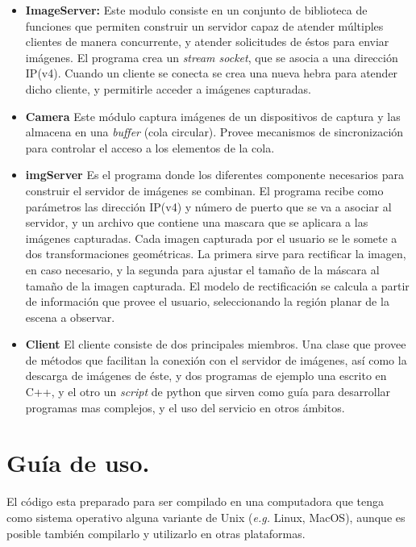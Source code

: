 \documentclass[12pt,letterpaper,notitlepage]{report}
\newlength{\spacing} \setlength{\spacing}{\baselineskip}
\newcommand{\nspace}[1]{\setlength{\baselineskip}{#1\spacing}}
\newenvironment{linespacing}[1]{\nspace{#1}}{}
\begin{document}
{\begin{linespacing}{1.5}
\begin{itemize}

\item {\bfseries ImageServer:} Este modulo consiste en un conjunto de biblioteca de funciones que permiten construir un servidor capaz de atender múltiples clientes de manera concurrente, y atender solicitudes de éstos para enviar imágenes. El programa crea un \emph {stream socket}, que se asocia a una dirección IP(v4). Cuando un cliente se conecta se crea una nueva hebra para atender dicho cliente, y permitirle acceder a imágenes capturadas.

\item {\bfseries Camera} Este módulo captura imágenes de un dispositivos de captura y las almacena en una \emph {buffer} (cola circular). Provee mecanismos de sincronización para controlar el acceso a los elementos de la cola.

\item {\bfseries imgServer} Es el programa donde los diferentes componente necesarios para construir el servidor de imágenes se combinan. El programa recibe como parámetros las dirección IP(v4) y número de puerto que se va a asociar al servidor, y un archivo que contiene una mascara que se aplicara a las imágenes capturadas. Cada imagen capturada por el usuario se le somete a dos transformaciones geométricas. La primera sirve para rectificar la imagen, en caso necesario, y la segunda para ajustar el tamaño de la máscara al tamaño de la imagen capturada. El modelo de rectificación se calcula a partir de información que provee el usuario, seleccionando la región planar de la escena a observar. 

\item {\bfseries Client} El cliente consiste de dos principales miembros. Una clase que provee de métodos que facilitan la conexión con el servidor de imágenes, así como la descarga de imágenes de éste, y dos programas de ejemplo una escrito en C++, y el otro un \emph {script} de python que sirven como guía para desarrollar programas mas complejos, y el uso del servicio en otros ámbitos. 

\end{itemize}

\section{Guía de uso.}
 
El  código esta  preparado para  ser compilado  en una  computadora que
tenga como  sistema operativo alguna  variante de Unix (\emph  {e.g. }
Linux, MacOS),  aunque es posible  también compilarlo y  utilizarlo en
otras plataformas.


\end{linespacing}}
\end{document}
